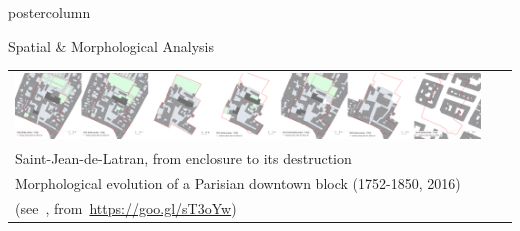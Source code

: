 \documentclass[final,hyperref={pdfpagelabels=false}]{beamer}
\let\oldcite=\cite
\renewcommand{\cite}[1]{\textcolor{ta3chameleon}{\oldcite{#1}}}
\begin{document}
\begin{frame}
\begin{columns}
\begin{column}{0.5\textwidth}
\begin{beamercolorbox}[center,wd=\textwidth]{postercolumn}
\begin{minipage}[t]{.98\textwidth}
\begin{block}{Spatial \& Morphological Analysis}
        
        \begin{tabular}{>{\centering}m{}}
	  
	  \includegraphics[width=0.95\textwidth]{figures/Latran_1752-2016}\\
	  \scriptsize Saint-Jean-de-Latran, from enclosure to its destruction\\
	  \scriptsize Morphological evolution of a Parisian downtown block (1752-1850, 2016)\\
	  (see~\cite{Rebolledo-Dhuin2014}, from~\url{https://goo.gl/sT3oYw})
        \end{tabular}
        

\end{block}
\end{minipage}
\end{beamercolorbox}
\end{column}
\end{columns}
\end{frame}
\end{document}
